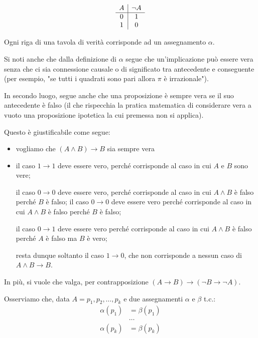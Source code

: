 \documentclass[a4paper,11pt]{report}
\begin{document}
\[  
    \begin{array}{c | c}
        A & \neg A \\
        \hline
        0 & 1 \\
        1 & 0
    \end{array}
\]

Ogni riga di una tavola di verità corrisponde ad un assegnamento \( \alpha \).

Si noti anche che dalla definizione di \( \alpha \) segue che un'implicazione può essere vera senza che ci sia connessione causale o di significato tra antecedente e conseguente (per esempio, "se tutti i quadrati sono pari allora \( \pi \) è irrazionale"). 

In secondo luogo, segue anche che una proposizione è sempre vera se il suo antecedente è falso (il che rispecchia la pratica matematica di considerare vera a vuoto una proposizione ipotetica la cui premessa non si applica).


{\color{CadetBlue} Questo è giustificabile come segue:
    \begin{itemize}
        \item vogliamo che \( (A \land B) \to B \) sia sempre vera
        \item il caso \( 1 \to 1 \) deve essere vero, perché corrisponde al caso in cui \( A \) e \( B \) sono vere; 

            il caso \( 0 \to 0  \) deve essere vero, perché corrisponde al caso in cui \( A\land B \) è falso perché \( B \) è falso; il caso \( 0 \to 0 \) deve essere vero perché corrisponde al caso in cui \( A \land B \) è falso perché \( B \) è falso; 

            il caso \( 0 \to 1 \) deve essere vero perché corrisponde al caso in cui \( A \land B \) è falso perché \( A \) è falso ma \( B \) è vero; 

            resta dunque soltanto il caso \( 1 \to 0 \), che non corrisponde a nessun caso di \( A \land B \to B \).
    \end{itemize}

In più, si vuole che valga, per contrapposizione \( (A \to B)\to(\neg B \to \neg A) \).}

\label{asseq}
Osserviamo che, data \( A = p_1, p_2, \dots, p_k \) e due assegnamenti \( \alpha \) e \( \beta \) t.c.:
\begin{align*}
    \alpha(p_1) &= \beta(p_1) \\
                &\dots \\
    \alpha(p_k) &= \beta(p_k)
\end{align*}
\end{document}
